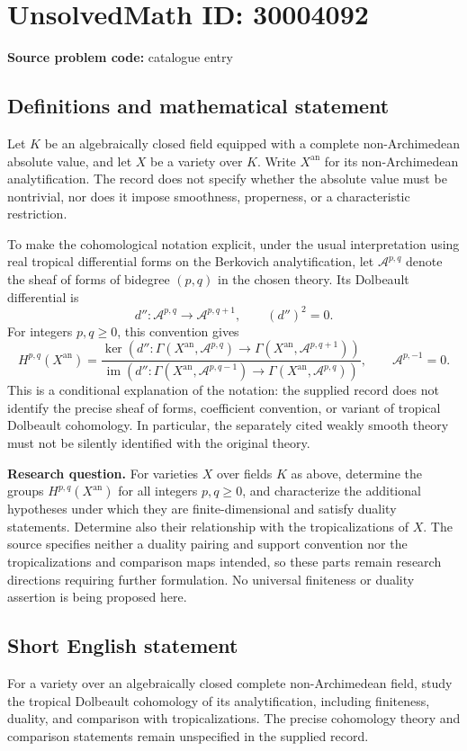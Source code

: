 \documentclass[11pt]{article}
\begin{document}
\section*{UnsolvedMath ID: 30004092}
\textbf{Source problem code:} catalogue entry
\subsection{Definitions and mathematical statement}
Let \(K\) be an algebraically closed field equipped with a complete non-Archimedean absolute value, and let \(X\) be a variety over \(K\). Write \(X^{\mathrm{an}}\) for its non-Archimedean analytification. The record does not specify whether the absolute value must be nontrivial, nor does it impose smoothness, properness, or a characteristic restriction.

To make the cohomological notation explicit, under the usual interpretation using real tropical differential forms on the Berkovich analytification, let \(\mathcal A^{p,q}\) denote the sheaf of forms of bidegree \((p,q)\) in the chosen theory. Its Dolbeault differential is
\[
 d''\colon \mathcal A^{p,q}\longrightarrow\mathcal A^{p,q+1},
 \qquad (d'')^2=0.
\]
For integers \(p,q\geq 0\), this convention gives
\[
 H^{p,q}(X^{\mathrm{an}})
 =
 \frac{\ker\!\left(d''\colon\Gamma(X^{\mathrm{an}},\mathcal A^{p,q})\longrightarrow\Gamma(X^{\mathrm{an}},\mathcal A^{p,q+1})\right)}
 {\operatorname{im}\!\left(d''\colon\Gamma(X^{\mathrm{an}},\mathcal A^{p,q-1})\longrightarrow\Gamma(X^{\mathrm{an}},\mathcal A^{p,q})\right)},
 \qquad \mathcal A^{p,-1}=0.
\]
This is a conditional explanation of the notation: the supplied record does not identify the precise sheaf of forms, coefficient convention, or variant of tropical Dolbeault cohomology. In particular, the separately cited weakly smooth theory must not be silently identified with the original theory.

\textbf{Research question.} For varieties \(X\) over fields \(K\) as above, determine the groups \(H^{p,q}(X^{\mathrm{an}})\) for all integers \(p,q\geq0\), and characterize the additional hypotheses under which they are finite-dimensional and satisfy duality statements. Determine also their relationship with the tropicalizations of \(X\). The source specifies neither a duality pairing and support convention nor the tropicalizations and comparison maps intended, so these parts remain research directions requiring further formulation. No universal finiteness or duality assertion is being proposed here.
\subsection{Short English statement}
For a variety over an algebraically closed complete non-Archimedean field, study the tropical Dolbeault cohomology of its analytification, including finiteness, duality, and comparison with tropicalizations. The precise cohomology theory and comparison statements remain unspecified in the supplied record.
\end{document}
